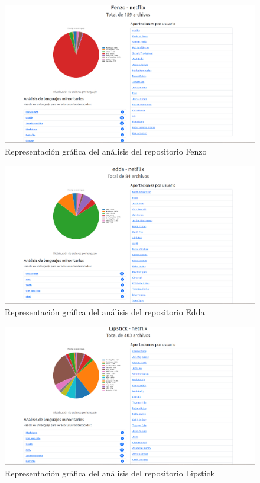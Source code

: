 \documentclass[a4paper, 12pt]{book}
\begin{document}
\begin{figure}[H]
  \centering
  \includegraphics[width=1\textwidth]{img/fenzo.png}
  \caption{Representación gráfica del análisis del repositorio Fenzo}
  \label{figura:analisisfenzo}
\end{figure}
\begin{figure}[H]
  \centering
  \includegraphics[width=1\textwidth]{img/edda.png}
  \caption{Representación gráfica del análisis del repositorio Edda}
  \label{figura:analisisedda}
\end{figure}
\begin{figure}[H]
  \centering
  \includegraphics[width=1\textwidth]{img/lipstick.png}
  \caption{Representación gráfica del análisis del repositorio Lipstick}
  \label{figura:analisislipstick}
\end{figure}
\end{document}
